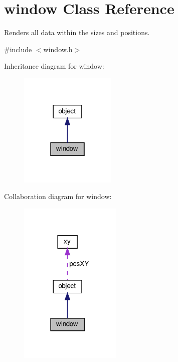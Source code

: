 \hypertarget{classwindow}{}\section{window Class Reference}
\label{classwindow}


Renders all data within the sizes and positions.  




{\ttfamily \#include $<$window.\+h$>$}



Inheritance diagram for window\+:
\nopagebreak
\begin{figure}[H]
\begin{center}
\leavevmode
\includegraphics[width=130pt]{classwindow__inherit__graph}
\end{center}
\end{figure}


Collaboration diagram for window\+:
\nopagebreak
\begin{figure}[H]
\begin{center}
\leavevmode
\includegraphics[width=138pt]{classwindow__coll__graph}
\end{center}
\end{figure}
